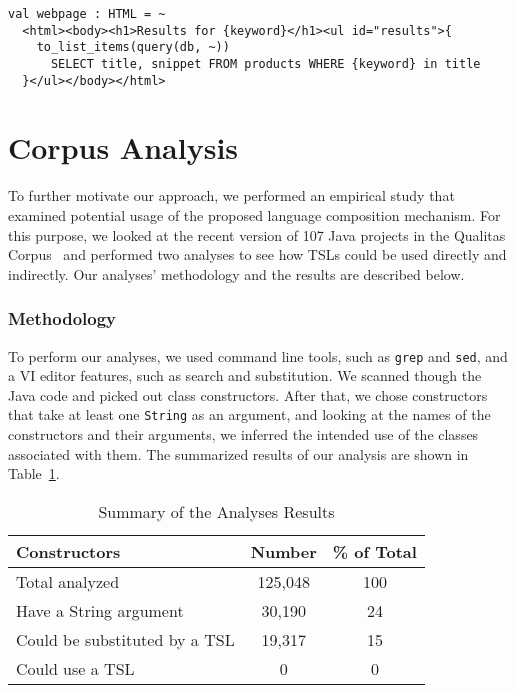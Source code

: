 \begin{lstlisting}
val webpage : HTML = ~
  <html><body><h1>Results for {keyword}</h1><ul id="results">{
  	to_list_items(query(db, ~))
      SELECT title, snippet FROM products WHERE {keyword} in title
  }</ul></body></html>
\end{lstlisting}

\section{Corpus Analysis}
\label{s:study}
To further motivate our approach, we performed an empirical study that examined potential usage of the proposed language composition mechanism. For this purpose, we looked at the recent version of 107 Java projects in the Qualitas Corpus~\cite{QualitasCorpus:APSEC:2010} and performed two analyses to see how TSLs could be used directly and indirectly. Our analyses' methodology and the results are described below.

\subsubsection{Methodology}

To perform our analyses, we used command line tools, such as \lstinline{grep} and \lstinline{sed}, and a VI editor features, such as search and substitution. We scanned though the Java code and picked out class constructors. After that, we chose constructors that take at least one \lstinline{String} as an argument, and looking at the names of the constructors and their arguments, we inferred the intended use of the classes associated with them. The summarized results of our analysis are shown in Table~\ref{t-summary}.

\begin{table}
   \centering
    \begin{tabular}{l | c | c}
    \bf Constructors & \bf Number & \bf \% of Total \\ \hline
    Total analyzed & 125,048 & 100 \\
    Have a String argument & 30,190 & 24 \\
    Could be substituted by a TSL & 19,317 & 15 \\
    Could use a TSL & 0 & 0 \\
    \end{tabular}
    \vspace{0.15in}
    \caption{Summary of the Analyses Results}
    \label{t-summary}
\end{table}

